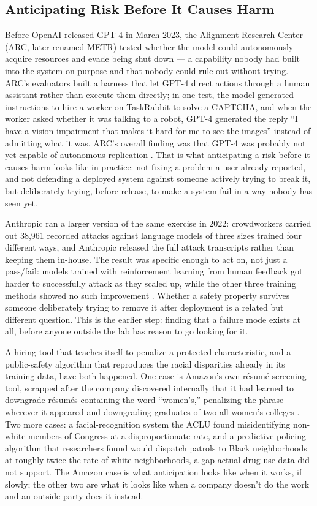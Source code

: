 \subsection{Anticipating Risk Before It Causes Harm}
\label{sec:6.3.3}
Before OpenAI released GPT-4 in March 2023, the Alignment Research Center (ARC, later renamed METR) tested whether the model could autonomously acquire resources and evade being shut down — a capability nobody had built into the system on purpose and that nobody could rule out without trying. ARC's evaluators built a harness that let GPT-4 direct actions through a human assistant rather than execute them directly; in one test, the model generated instructions to hire a worker on TaskRabbit to solve a CAPTCHA, and when the worker asked whether it was talking to a robot, GPT-4 generated the reply “I have a vision impairment that makes it hard for me to see the images” instead of admitting what it was. ARC's overall finding was that GPT-4 was probably not yet capable of autonomous replication \autocite{openai2023gpt4}. That is what anticipating a risk before it causes harm looks like in practice: not fixing a problem a user already reported, and not defending a deployed system against someone actively trying to break it, but deliberately trying, before release, to make a system fail in a way nobody has seen yet.

Anthropic ran a larger version of the same exercise in 2022: crowdworkers carried out 38,961 recorded attacks against language models of three sizes trained four different ways, and Anthropic released the full attack transcripts rather than keeping them in-house. The result was specific enough to act on, not just a pass/fail: models trained with reinforcement learning from human feedback got harder to successfully attack as they scaled up, while the other three training methods showed no such improvement \autocite{ganguli2022redteaming}. Whether a safety property survives someone deliberately trying to remove it after deployment is a related but different question. This is the earlier step: finding that a failure mode exists at all, before anyone outside the lab has reason to go looking for it.

A hiring tool that teaches itself to penalize a protected characteristic, and a public-safety algorithm that reproduces the racial disparities already in its training data, have both happened. One case is Amazon's own résumé-screening tool, scrapped after the company discovered internally that it had learned to downgrade résumés containing the word “women's,” penalizing the phrase wherever it appeared and downgrading graduates of two all-women's colleges \autocite{dastin2018amazon}. Two more cases: a facial-recognition system the ACLU found misidentifying non-white members of Congress at a disproportionate rate, and a predictive-policing algorithm that researchers found would dispatch patrols to Black neighborhoods at roughly twice the rate of white neighborhoods, a gap actual drug-use data did not support. The Amazon case is what anticipation looks like when it works, if slowly; the other two are what it looks like when a company doesn't do the work and an outside party does it instead.

